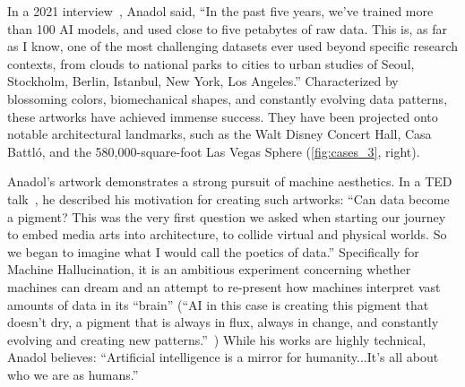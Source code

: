 In a 2021 interview~\cite{momainterview}, Anadol said, ``In the past five years, we’ve trained more than 100 AI models, and used close to five petabytes of raw data. This is, as far as I know, one of the most challenging datasets ever used beyond specific research contexts, from clouds to national parks to cities to urban studies of Seoul, Stockholm, Berlin, Istanbul, New York, Los Angeles.'' 
Characterized by blossoming colors, biomechanical shapes, and constantly evolving data patterns, these artworks have achieved immense success. They have been projected onto notable architectural landmarks, such as the Walt Disney Concert Hall, Casa Battló, and the 580,000-square-foot Las Vegas Sphere (\autoref{fig:cases_3}, right).


Anadol's artwork demonstrates a strong pursuit of machine aesthetics. In a TED talk~\cite{ted}, he described his motivation for creating such artworks: ``Can data become a pigment? This was the very first question we asked when starting our journey to embed media arts into architecture, to collide virtual and physical worlds. So we began to imagine what I would call the poetics of data.'' Specifically for Machine Hallucination, it is an ambitious experiment concerning whether machines can dream and an attempt to re-present how machines interpret vast amounts of data in its ``brain'' (``AI in this case is creating this pigment that doesn't dry, a pigment that is always in flux, always in change, and constantly evolving and creating new patterns.''~\cite{yahoo})
While his works are highly technical, Anadol believes: ``Artificial intelligence is a mirror for humanity...It’s all about who we are as humans.''~\cite{fastcompany2}





